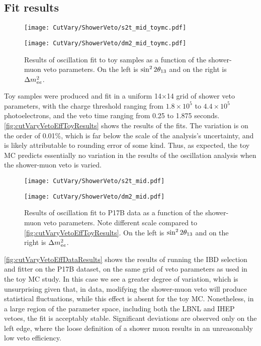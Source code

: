 \documentclass[../thesis.tex]{subfiles}
\begin{document}
\subsection{Fit results}%
\label{sec:cutVaryMuVetoDataResults}

\begin{figure}[ht]
  \begin{minipage}{0.5\linewidth}%
    \texttt{[image: CutVary/ShowerVeto/s2t\_mid\_toymc.pdf]}%
  \end{minipage}%
  \begin{minipage}{0.5\linewidth}%
    \texttt{[image: CutVary/ShowerVeto/dm2\_mid\_toymc.pdf]}%
  \end{minipage}%
  \caption{Results of oscillation fit to toy samples as a function of the shower-muon veto parameters. On the left is $\sin^2 2\theta_{13}$ and on the right is $\Delta m^2_{ee}$.}
  \label{fig:cutVaryVetoEffToyResults}
\end{figure}

Toy samples were produced and fit in a uniform 14$\times$14 grid of shower veto parameters, with the charge threshold ranging from $1.8\times10^5$ to $4.4\times10^5$ photoelectrons, and the veto time ranging from 0.25 to 1.875 seconds. \autoref{fig:cutVaryVetoEffToyResults} shows the results of the fits. The variation is on the order of 0.01\%, which is far below the scale of the analysis's uncertainty, and is likely attributable to rounding error of some kind. Thus, as expected, the toy MC predicts essentially no variation in the results of the oscillation analysis when the shower-muon veto is varied.

\begin{figure}[ht]
  \begin{minipage}{0.5\linewidth}%
    \texttt{[image: CutVary/ShowerVeto/s2t\_mid.pdf]}%
  \end{minipage}%
  \begin{minipage}{0.5\linewidth}%
    \texttt{[image: CutVary/ShowerVeto/dm2\_mid.pdf]}%
  \end{minipage}%
  \caption{Results of oscillation fit to P17B data as a function of the shower-muon veto parameters. Note different scale compared to \autoref{fig:cutVaryVetoEffToyResults}. On the left is $\sin^2 2\theta_{13}$ and on the right is $\Delta m^2_{ee}$.}
  \label{fig:cutVaryVetoEffDataResults}
\end{figure}

\autoref{fig:cutVaryVetoEffDataResults} shows the results of running the IBD selection and fitter on the P17B dataset, on the same grid of veto parameters as used in the toy MC study. In this case we see a greater degree of variation, which is unsurprising given that, in data, modifying the shower-muon veto will produce statistical fluctuations, while this effect is absent for the toy MC. Nonetheless, in a large region of the parameter space, including both the LBNL and IHEP vetoes, the fit is acceptably stable. Significant deviations are observed only on the left edge, where the loose definition of a shower muon results in an unreasonably low veto efficiency.
\end{document}
